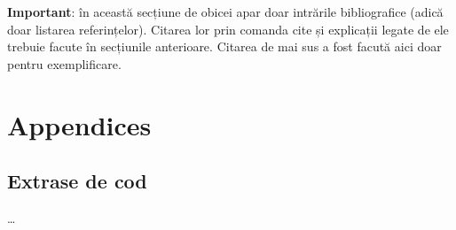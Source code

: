\documentclass[12pt,a4paper]{report}
\begin{document}
\textbf{Important}: în această secțiune de obicei apar doar intrările bibliografice (adică doar listarea referințelor). Citarea lor prin comanda cite și explicații legate de ele trebuie facute în secțiunile anterioare. Citarea de mai sus a fost facută aici doar pentru exemplificare.







\chapter*{Appendices}
\begin{appendices}

\chapter{Extrase de cod} %
\ldots


\end{appendices}
\end{document}
